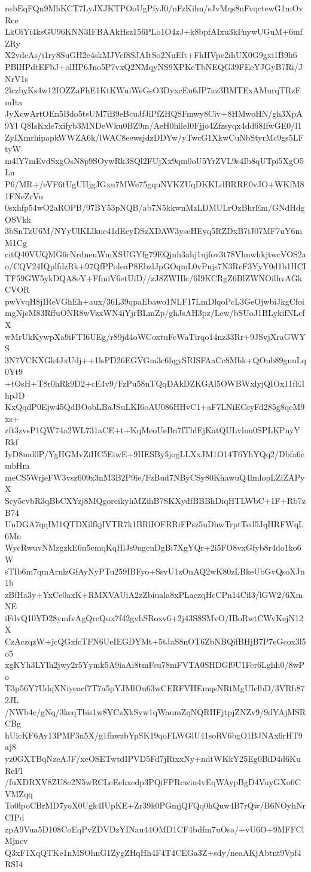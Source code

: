 nsbEqFQn9MhKCT7LyJXJKTPOoUgPfyJ0/nFzKihn/sJvMqs8nFvqctewG1mOvRce
LkOiYi4ksGU96KNN3IFBAAkHsz156PLo1O4zJ+k8bpfAIxu3kFnywUGuM+6mfZRy
X2vdcAs/i1ry8SuGH2e4skMJVef8SJAItSo2NuEft+FhHVpe2ihUX0G9gxi1B9h6
PBlHPdtEFbJ+olHP6Jno5P7vxQ2NMqyNS9XPKeTbNEQG39FEeYJGyB7Ri/JNrV1s
2lczbyKs4w12IOZZaFhE1KtKWuiWeGsO3DyxcEu6JP7az3BMTExAMurqTRzFmIta
JyXcwArtOEn5Bdo5tsUM7iB9eBcuJfJiPfZHQSFmwy8Civ+8HMwoHN/gh3XpA9Yl
Q8IsKxle7xifyb3MNDeWku0BZ9m/AeH0hileI0Fjjo4Zfzsyqx4dd68IfwGE0/l1
ZyIXmrhipapkWWZA6k/lWAC8eewsjdzDDYw/yTwcG1XkwCuNbStyrMc9gs5LFtyW
m4lY7mEvdSxgOsN8p9SOywRk3SQl2FUjXx9qm0oU5YrZVL9s4Ib8qUTpi5XgO5Ln
P6/MR+/eVF6tUgUHjgJGxu7MWe75gquNVKZUqDKKLdBRRE0vJO+WKfM81FNeZrVu
0sxhfp54wO2aROPB/97BY53pNQB/ab7N5kkwnMzLDMULrOzBhrEm/GNdHdgOSVkk
3bSnTzU6M/NYyUlKLlkue41dEeyDSzXDAW3yseHEyq5RZDxB7iJ07MF7uY6mM1Cg
citQ40VUQMG6rNrdneuWmXSUGYfg79EQjnh3ahj1ujfov3t78VhnwhkjtwcVOS2a
o/CQV24IQplfdzRk+97QfPPoleaP8EbzlJpGOqmL0vPujs7N3RcF3YyY0d1b1HCI
TF59GW5ykDQA8eY+FfmiV6etUiD//zJ8ZWHlc/6I9KCRgZ6BlZWNOilhvAGkCVOR
pwVvqH8jIReVGhEh+aux/36L39qpaEbawo1NLF17LmDlqoPcL3GeOjwbiJkgCfoi
mgNjcM83RffuONR8wVzxWN4iYjrBLmZp/ghJsAH3pz/Lew/bSUoJ1BLykifNLcfX
wMrUkKywpXa9iFTI6UEg/r89jd4oWCoxtuFcWaTirqo14nz33Rr+9JSvjXraGWYS
3N7VCKXGk4JxUdj++1lsPD26EGVGm3c6hgySRISFAaCc8Mbk+QOnb89gnuLq0Yt9
+tOsH+T8r0hRk9D2+cE4v9/FzPu58nTQqDAkDZKGAl5OWBWxlyjQIOx11fE1hpJD
KxQqdP0Ejw45QdBOobLBaJSuLKI6oAU086HHvC1+aF7LNiECsyFd285g8qcM9xs+
zft3zvsP1QW74a2WL731aCE+t+KqMeoUeBn7lThlEjKatQULvlnu0SPLKPnyYRkf
IyD8md0P/YgHGMvZiHC5EiwE+9HESBy5jogLLXxJM1O14T6YhYQq2/Dbfa6cmbHm
meCS5WrjeFW3vsz609x3nM3B2P9ie/FzBud7NByCSy80KhawuQ4lmlopLZiZAPyX
Scy5cvbR3qBbCXYzj8MQgorcikyhMZihB7SKXydfBBBhDiqHTLWbC+1F+Rb7zB74
UnDGA7qqIM1QTDXilfkjIVTR7k1BRlIOFRRiFPsz5uDhwTrptTed5JqHRFWqL6Mn
WycRwuvNMzgzkE6n5cmqKqHlJs9ngcnDgBi7XgYQr+2i5FO8vxGfyb8r4do1ko6W
sTIb6m7qmArnlzGfAyNyPTu259IBFyo+SsvU1zOnAQ2wK80zLBkeUbGvQsoXJn1b
zBfHa3y+YxCe0axK+RMXVAUiA2zZbiuala8xPLaczqHcCPn14Cil3/lGW2/6XmNE
iFdvQ10YD28ymfvAgQrcQux7f42gvhSRoxv6+2j43S8SMvO/IBoRwtCWvKejN12X
CzAczqzW+jcQGxfcTFN6UeIEGDYMt+5tJaS8nOT6ZbNBQifBHjB7P7eGcox3l5o5
xgKYh3LYIh2jwy2r5Yymk5A9iaAi8tmFsu78mFVTA0SHDGf9U1Fcr6Lghh0/8wPo
T3p56Y7UdqXNiyeacf7T7a5pYJMlOu63wCERFVHEmqsNRtMgUIclbD/3VRh872JL
/NWb4c/gNq/3keqTbis1w8YCzXkSyw1qWaumZqNQRHFjtpjZNZv9/9dYAjMSRCBg
hUicKF6Ay13PMF3n5X/g1fhwzbYpSK19qoFLWGlU41soRV6bgO1BJNAx6rHT9aj8
yz0GXTBqNzeAJF/xeOSETwtdIPVD5Fd7jRixxNy+ndtWKkY25Eg0BiD4d6KuReFl
/fuXDRXV8ZU8e2N5wRCLeEehxedp3PQiFPRcwiu4vEqWAypBgD4VuyGXo6CVMZqq
To0lpoCBrMD7yoX0Ugk4IUpKE+Zr39k0PGmjQFQq0hQuw4B7rQw/B6NOyhNrCIPd
zpA9Vua5D108CoEqPvZDVDzYINau44OMD1CF4bdfm7uOsa/+vU6O+9MFFClMjncv
Q3xF1XqQTKe1nMSOhnG1ZygZHqHh4F4T4CEGa3Z+sdy/neaAKjAbtnt9Vpf4RSI4
